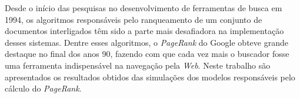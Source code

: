 \documentclass[brazil,ruledheader]{abntifes}
\begin{document}

\begin{resumo}
Desde o início das pesquisas no desenvolvimento de ferramentas de busca em 1994, os algoritmos responsáveis pelo ranqueamento de um conjunto de documentos interligados têm sido a parte mais desafiadora na implementação desses sistemas. Dentre esses algoritmos, o \textit{PageRank} do Google obteve grande destaque no final dos anos 90, fazendo com que cada vez mais o buscador fosse uma ferramenta indispensável na navegação pela \textit{Web}. Neste trabalho são apresentados os resultados obtidos das simulações dos modelos responsáveis pelo cálculo do \textit{PageRank}.


\end{resumo}

\listoffigures



\tableofcontents{}











%





\anexo
\end{document}
